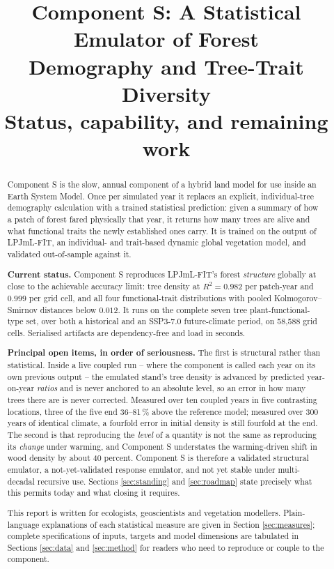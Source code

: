 \documentclass[11pt]{article}
\title{\textbf{Component S: A Statistical Emulator of Forest\\ Demography and Tree-Trait Diversity}\\
\large Status, capability, and remaining work}
\author{}
\date{}
\begin{document}
\maketitle

\begin{abstract}
\noindent
Component S is the slow, annual component of a hybrid land model for use inside an Earth System Model. Once per simulated year it replaces an explicit, individual-tree demography calculation with a trained statistical prediction: given a summary of how a patch of forest fared physically that year, it returns how many trees are alive and what functional traits the newly established ones carry. It is trained on the output of LPJmL-FIT, an individual- and trait-based dynamic global vegetation model, and validated out-of-sample against it.

\textbf{Current status.} Component S reproduces LPJmL-FIT's forest \emph{structure} globally at close to the achievable accuracy limit: tree density at $R^2 = 0.982$ per patch-year and $0.999$ per grid cell, and all four functional-trait distributions with pooled Kolmogorov--Smirnov distances below $0.012$. It runs on the complete seven tree plant-functional-type set, over both a historical and an SSP3-7.0 future-climate period, on 58{,}588 grid cells. Serialised artifacts are dependency-free and load in seconds.

\textbf{Principal open items, in order of seriousness.} The first is structural rather than statistical. Inside a live coupled run -- where the component is called each year on its own previous output -- the emulated stand's tree density is advanced by predicted year-on-year \emph{ratios} and is never anchored to an absolute level, so an error in how many trees there are is never corrected. Measured over ten coupled years in five contrasting locations, three of the five end 36--81\,\% above the reference model; measured over 300 years of identical climate, a fourfold error in initial density is still fourfold at the end. The second is that reproducing the \emph{level} of a quantity is not the same as reproducing its \emph{change} under warming, and Component S understates the warming-driven shift in wood density by about 40 percent. Component S is therefore a validated structural emulator, a not-yet-validated response emulator, and not yet stable under multi-decadal recursive use. Sections \ref{sec:standing} and \ref{sec:roadmap} state precisely what this permits today and what closing it requires.

This report is written for ecologists, geoscientists and vegetation modellers. Plain-language explanations of each statistical measure are given in Section \ref{sec:measures}; complete specifications of inputs, targets and model dimensions are tabulated in Sections \ref{sec:data} and \ref{sec:method} for readers who need to reproduce or couple to the component.
\end{abstract}
\end{document}
